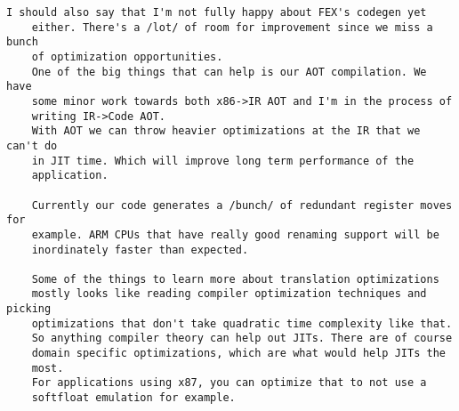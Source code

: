 \begin{Verbatim}[fontsize=\footnotesize]
	I should also say that I'm not fully happy about FEX's codegen yet
	either. There's a /lot/ of room for improvement since we miss a bunch
	of optimization opportunities.
	One of the big things that can help is our AOT compilation. We have
	some minor work towards both x86->IR AOT and I'm in the process of
	writing IR->Code AOT.
	With AOT we can throw heavier optimizations at the IR that we can't do
	in JIT time. Which will improve long term performance of the
	application.
	
	Currently our code generates a /bunch/ of redundant register moves for
	example. ARM CPUs that have really good renaming support will be
	inordinately faster than expected.
	
	Some of the things to learn more about translation optimizations
	mostly looks like reading compiler optimization techniques and picking
	optimizations that don't take quadratic time complexity like that.
	So anything compiler theory can help out JITs. There are of course
	domain specific optimizations, which are what would help JITs the
	most.
	For applications using x87, you can optimize that to not use a
	softfloat emulation for example.
\end{Verbatim}

\pagebreak